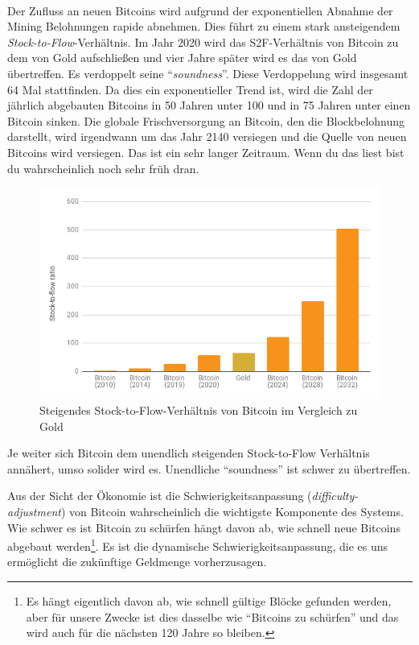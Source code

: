 \paragraph{}
Der Zufluss an neuen Bitcoins wird aufgrund der exponentiellen Abnahme der
Mining Belohnungen rapide abnehmen. Dies führt zu einem stark ansteigendem
\textit{Stock-to-Flow}-Verhältnis. Im Jahr 2020 wird das S2F-Verhältnis von Bitcoin
zu dem von Gold aufschließen und vier Jahre später wird es das von Gold übertreffen. Es
verdoppelt seine \enquote{\textit{soundness}}. Diese Verdoppelung wird insgesamt
64 Mal stattfinden. Da dies ein exponentieller Trend ist, wird die Zahl der
jährlich abgebauten Bitcoins in 50 Jahren unter 100 und in 75 Jahren
unter einen Bitcoin sinken. Die globale Frischversorgung an Bitcoin, den die
Blockbelohnung darstellt, wird irgendwann um das Jahr 2140 versiegen und die
Quelle von neuen Bitcoins wird versiegen. Das ist ein sehr langer Zeitraum. Wenn
du das liest bist du wahrscheinlich noch sehr früh dran.

\begin{figure}
  \includegraphics{assets/images/soundness-over-time.png}
  \caption{Steigendes Stock-to-Flow-Verhältnis von Bitcoin im Vergleich zu Gold}
  \label{fig:soundness-over-time}
\end{figure}

Je weiter sich Bitcoin dem unendlich steigenden Stock-to-Flow Verhältnis
annähert, umso solider wird es. Unendliche \enquote{soundness} ist schwer zu
übertreffen.

Aus der Sicht der Ökonomie ist die Schwierigkeitsanpassung
(\textit{difficulty-adjustment}) von Bitcoin wahrscheinlich die wichtigste
Komponente des Systems. Wie schwer es ist Bitcoin zu schürfen hängt davon ab,
wie schnell neue Bitcoins abgebaut werden\footnote{Es hängt eigentlich davon ab,
wie schnell gültige Blöcke gefunden werden, aber für unsere Zwecke ist dies
dasselbe wie \enquote{Bitcoins zu schürfen} und das wird auch für die nächsten
120 Jahre so bleiben.}. Es ist die dynamische Schwierigkeitsanpassung, die es
uns ermöglicht die zukünftige Geldmenge vorherzusagen.

